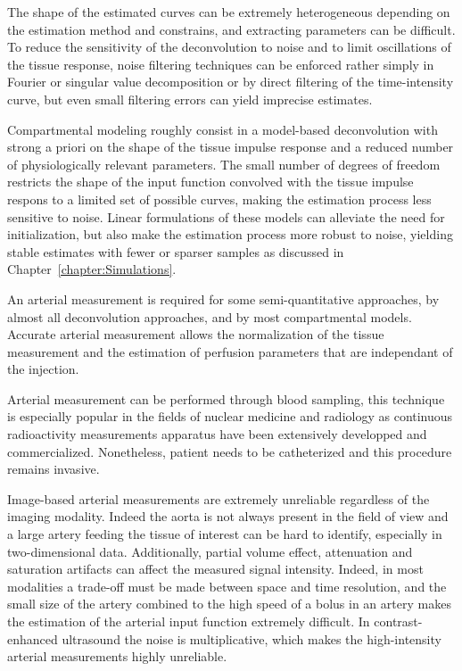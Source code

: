 The shape of the estimated curves can be extremely heterogeneous depending on the estimation method and constrains, and extracting parameters can be difficult. 
To reduce the sensitivity of the deconvolution to noise and to limit oscillations of the tissue response, noise filtering techniques can be enforced rather simply in Fourier or singular value decomposition or by direct filtering of the time-intensity curve, but even small filtering errors can yield imprecise estimates.

Compartmental modeling roughly consist in a model-based deconvolution with strong a priori on the shape of the tissue impulse response and a reduced number of physiologically relevant parameters. 
The small number of degrees of freedom restricts the shape of the input function convolved with the tissue impulse respons to a limited set of possible curves, making the estimation process less sensitive to noise.
Linear formulations of these models can alleviate the need for initialization, but also make the estimation process more robust to noise, yielding stable estimates with fewer or sparser samples as discussed in Chapter~\ref{chapter:Simulations}.

An arterial measurement is required for some semi-quantitative approaches, by almost all deconvolution approaches, and by most compartmental models. 
Accurate arterial measurement allows the normalization of the tissue measurement and the estimation of perfusion parameters that are independant of the injection.

Arterial measurement can be performed through blood sampling, this technique is especially popular in the fields of nuclear medicine and radiology as continuous radioactivity measurements apparatus have been extensively developped and commercialized.
Nonetheless, patient needs to be catheterized and this procedure remains invasive. 

Image-based arterial measurements are extremely unreliable regardless of the imaging modality. 
Indeed the aorta is not always present in the field of view and a large artery feeding the tissue of interest can be hard to identify, especially in two-dimensional data.
Additionally, partial volume effect, attenuation and saturation artifacts can affect the measured signal intensity.
Indeed, in most modalities a trade-off must be made between space and time resolution, and the small size of the artery combined to the high speed of a bolus in an artery makes the estimation of the arterial input function extremely difficult.
In contrast-enhanced ultrasound the noise is multiplicative, which makes the high-intensity arterial measurements highly unreliable.

